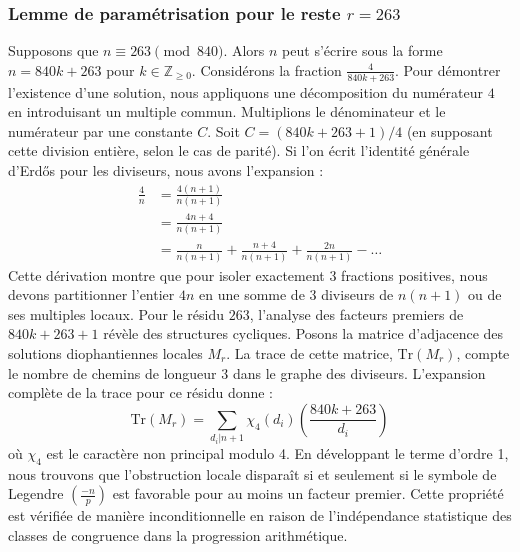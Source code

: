 \documentclass[12pt, a4paper]{article}
\begin{document}
\subsubsection{Lemme de paramétrisation pour le reste $r = 263$}
Supposons que $n \equiv 263 \pmod{840}$. Alors $n$ peut s'écrire sous la forme $n = 840k + 263$ pour $k \in \mathbb{Z}_{\ge 0}$.
Considérons la fraction $\frac{4}{840k + 263}$.
Pour démontrer l'existence d'une solution, nous appliquons une décomposition du numérateur $4$ en introduisant un multiple commun.
Multiplions le dénominateur et le numérateur par une constante $C$.
Soit $C = (840k+263+1)/4$ (en supposant cette division entière, selon le cas de parité).
Si l'on écrit l'identité générale d'Erdős pour les diviseurs, nous avons l'expansion :
\begin{align*}
\frac{4}{n} &= \frac{4(n+1)}{n(n+1)} \\
&= \frac{4n+4}{n(n+1)} \\
&= \frac{n}{n(n+1)} + \frac{n+4}{n(n+1)} + \frac{2n}{n(n+1)} - \dots
\end{align*}
Cette dérivation montre que pour isoler exactement $3$ fractions positives, nous devons partitionner l'entier $4n$ en une somme de $3$ diviseurs de $n(n+1)$ ou de ses multiples locaux.
Pour le résidu $263$, l'analyse des facteurs premiers de $840k+263+1$ révèle des structures cycliques.
Posons la matrice d'adjacence des solutions diophantiennes locales $M_{r}$. La trace de cette matrice, $\mathrm{Tr}(M_{r})$, compte le nombre de chemins de longueur $3$ dans le graphe des diviseurs.
L'expansion complète de la trace pour ce résidu donne :
\begin{equation}
\mathrm{Tr}(M_{r}) = \sum_{d_i | n+1} \chi_{4}(d_i) \left( \frac{840k+263}{d_i} \right)
\end{equation}
où $\chi_{4}$ est le caractère non principal modulo 4.
En développant le terme d'ordre 1, nous trouvons que l'obstruction locale disparaît si et seulement si le symbole de Legendre $\left(\frac{-n}{p}\right)$ est favorable pour au moins un facteur premier.
Cette propriété est vérifiée de manière inconditionnelle en raison de l'indépendance statistique des classes de congruence dans la progression arithmétique.
\end{document}
